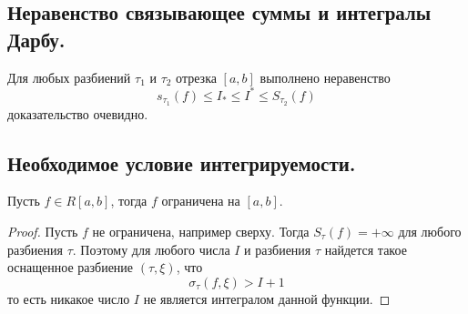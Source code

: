 \documentclass{article}
\begin{document}
\subsection{Неравенство связывающее суммы и интегралы Дарбу.}
Для любых разбиений $\tau_1$ и $\tau_2$ отрезка $[a, b]$ выполнено неравенство
$$
    s_{\tau_1}(f) \leq I_* \leq I^* \leq S_{\tau_2}(f)
$$
доказательство очевидно.
\subsection{Необходимое условие интегрируемости.}
Пусть $f \in R[a, b]$, тогда $f$ ограничена на $[a, b]$.
\begin{proof}
    Пусть $f$ не ограничена, например сверху. Тогда $S_\tau(f) = +\infty$ для любого разбиения $\tau$. Поэтому для любого числа $I$ и разбиения $\tau$ найдется такое оснащенное разбиение $(\tau, \xi)$, что
    $$
        \sigma_\tau(f, \xi) > I + 1
    $$
    то есть никакое число $I$ не является интегралом данной функции.
\end{proof}
\end{document}
